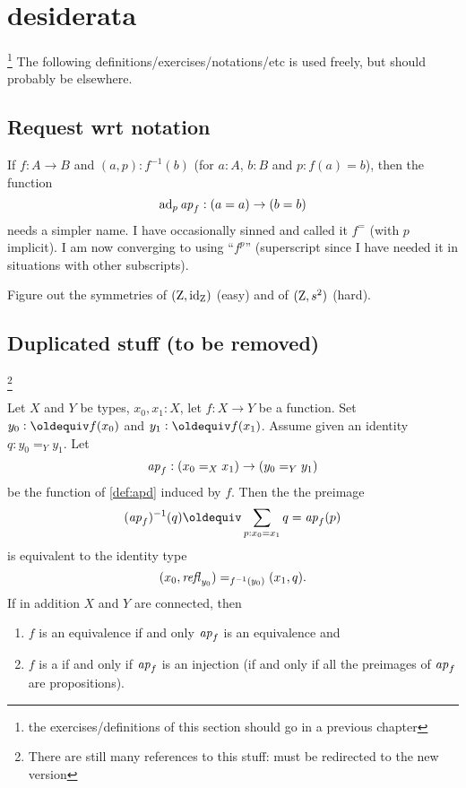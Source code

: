 {\color{blue}\small\section{desiderata}\footnote{the exercises/definitions of this section should go in a previous chapter}
The following definitions/exercises/notations/etc is used freely, but should probably be elsewhere.

\subsection{Request wrt notation}
\label{sec:requestnotation}

If $f:A\to B$ and $(a,p):f^{-1}(b)$ (for $a:A$, $b:B$ and $p:f(a)=b$), then the function
$$\mathrm{ad}_p\mathop{{\it ap}_{f}}:(a=a)\to(b=b)$$
needs a simpler name.  
I have occasionally sinned and called it $f^=$ (with $p$ implicit).  
I am now converging to using ``$f^p$'' (superscript since I have needed it in situations with other subscripts).

\begin{xca}\label{xca:zet-symmetries}
Figure out the symmetries of $(\mathrm{Z},\mathord{\mathrm{id}}_{\mathrm{Z}})$ (easy) and 
of $(\mathrm{Z},s^2)$ (hard).
\end{xca}

\subsection{Duplicated stuff (to be removed)}
\label{sec:eqconntypes}
\footnote{\color{red}There are still many references to this stuff: must be redirected to the new version}
\begin{lemma}
  \label{lem:eqandcovofconntypes}
  Let $X$ and $Y$ be types, $x_0,x_1:X$, let $f:X\to Y$ be a function.  Set $y_0\defequi f(x_0)$ and $y_1\defequi f(x_1)$. Assume given an identity $q:y_0=_Yy_1$. Let 
    $$%
\ap f:(x_0=_Xx_1)\to (y_0=_Yy_1)$$
be the function of \cref{def:apd} induced by $f$.  Then the  the preimage 
$$(\ap f)^{-1}(q)\jdeq\sum_{p:x_0=x_1}q=\ap f(p)$$ is equivalent to the identity type 
 $$(x_0,\mathop{{\it refl}_{y_0}})=_{f^{-1}(y_0)}(x_1,q).$$ 
If in addition $X$ and $Y$ are connected, then
\begin{enumerate}
\item $f$ is an equivalence if and only $\ap f%
$ is an equivalence and
\item $f$ is a \covering if and only if  $\ap f%
$ is an injection (\ie if and only if all the preimages of $\mathop{{\it ap}_{f}}$ are propositions).
\end{enumerate}


\end{lemma}}
